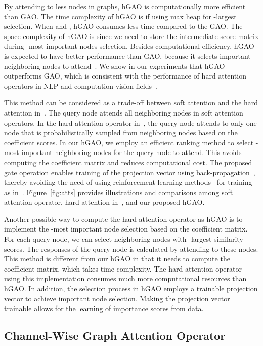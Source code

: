 \documentclass[sigconf]{acmart}
\begin{document}
By attending to less nodes in graphs, hGAO is computationally more
efficient than GAO. The time complexity of hGAO is  if using max heap for
-largest selection. When  and , hGAO consumes
less time compared to the GAO. The space complexity of hGAO is
 since we need to store the intermediate score matrix during
-most important nodes selection. Besides computational
efficiency, hGAO is expected to have better performance than GAO,
because it selects important neighboring nodes to
attend~\cite{malinowski2018learning}. We show in our experiments
that hGAO outperforms GAO, which is consistent with the performance
of hard attention operators in NLP and computation vision
fields~\cite{xu2015show,luong2015effective}.


This method can be considered as a trade-off between soft attention
and the hard attention in~\cite{xu2015show}. The query node attends
all neighboring nodes in soft attention operators. In the hard
attention operator in~\cite{xu2015show}, the query node attends to
only one node that is probabilistically sampled from neighboring
nodes based on the coefficient scores. In our hGAO, we employ an
efficient ranking method to select -most important neighboring
nodes for the query node to attend. This avoids computing the
coefficient matrix and reduces computational cost. The proposed gate
operation enables training of the projection vector 
using back-propagation~\cite{lecun2012efficient}, thereby avoiding
the need of using reinforcement learning
methods~\cite{rao2017attention} for training as
in~\cite{xu2015show}. Figure~\ref{fig:atts} provides illustrations
and comparisons among soft attention operator, hard attention
in~\cite{xu2015show}, and our proposed hGAO.

Another possible way to compute the hard attention operator as hGAO
is to implement the -most important node selection based on the
coefficient matrix. For each query node, we can select 
neighboring nodes with -largest similarity scores. The responses
of the query node is calculated by attending to these  nodes.
This method is different from our hGAO in that it needs to compute
the coefficient matrix, which takes  time
complexity. The hard attention operator using this implementation
consumes much more computational resources than hGAO. In addition,
the selection process in hGAO employs a trainable projection vector
 to achieve important node selection. Making the
projection vector  trainable allows for the learning
of importance scores from data.


\subsection{Channel-Wise Graph Attention Operator}
\end{document}
